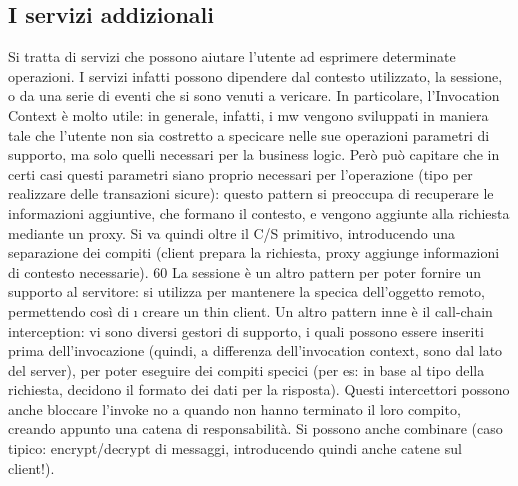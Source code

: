 \subsection{I servizi addizionali}
Si tratta di servizi che possono aiutare l'utente ad esprimere determinate operazioni. I servizi infatti possono
dipendere dal contesto utilizzato, la sessione, o
da una serie di eventi che si sono venuti a vericare.
In particolare, l'Invocation Context è molto utile: in generale, infatti, i mw
vengono sviluppati in maniera tale che l'utente non sia costretto a specicare
nelle sue operazioni parametri di supporto, ma solo quelli necessari per la business logic. Però può capitare che in
certi casi questi parametri siano proprio
necessari per l'operazione (tipo per realizzare delle transazioni sicure): questo
pattern si preoccupa di recuperare le informazioni aggiuntive, che formano il
contesto, e vengono aggiunte alla richiesta mediante un proxy. Si va quindi
oltre il C/S primitivo, introducendo una separazione dei compiti (client prepara
la richiesta, proxy aggiunge informazioni di contesto necessarie).
60
La sessione è un altro pattern per poter fornire un supporto al servitore:
si utilizza per mantenere la specica dell'oggetto remoto, permettendo così di
\i{}
creare un thin client.
Un altro pattern inne è il call-chain interception: vi sono diversi gestori
di supporto, i quali possono essere inseriti prima dell'invocazione (quindi, a
differenza dell'invocation context, sono dal lato del server), per poter eseguire
dei compiti specici (per es: in base al tipo della richiesta, decidono il formato
dei dati per la risposta). Questi intercettori possono anche bloccare l'invoke no
a quando non hanno terminato il loro compito, creando appunto una catena di
responsabilità. Si possono anche combinare (caso tipico: encrypt/decrypt di
messaggi, introducendo quindi anche catene sul client!).
